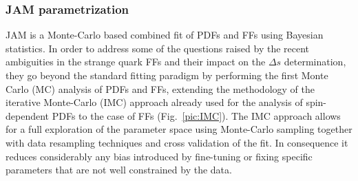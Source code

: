 \subsubsection*{JAM parametrization}

JAM is a Monte-Carlo based combined fit of PDFs and FFs using Bayesian statistics. In order to address some of the questions raised by the recent ambiguities in the strange quark FFs and their impact on the $\Delta s$ determination, they go beyond the standard fitting paradigm by performing the first Monte Carlo (MC) analysis of PDFs and FFs, extending the methodology of the iterative Monte-Carlo (IMC) approach already used for the analysis of spin-dependent PDFs \cite{IMC} to the case of FFs (Fig.~\ref{pic:IMC}). The IMC approach allows for a full exploration of the parameter space using Monte-Carlo sampling together with data resampling techniques and cross validation of the fit. In consequence it reduces considerably any bias introduced by fine-tuning or fixing specific parameters that are not well constrained by the data.


